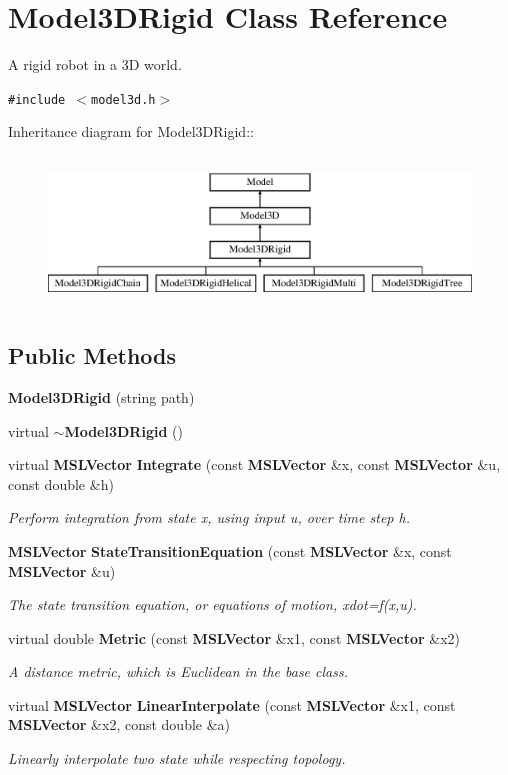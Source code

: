 \section{Model3DRigid  Class Reference}
\label{class_Model3DRigid}
A rigid robot in a 3D world. 


{\tt \#include $<$model3d.h$>$}

Inheritance diagram for Model3DRigid::\begin{figure}[H]
\begin{center}
\leavevmode
\includegraphics[height=4cm]{class_Model3DRigid}
\end{center}
\end{figure}
\subsection*{Public Methods}
\begin{CompactItemize}
\item 
{\bf Model3DRigid} (string path)
\item 
virtual {\bf $\sim$Model3DRigid} ()
\item 
virtual {\bf MSLVector} {\bf Integrate} (const {\bf MSLVector} \&x, const {\bf MSLVector} \&u, const double \&h)
\begin{CompactList}\small\item\em Perform integration from state x, using input u, over time step h.\item\end{CompactList}\item 
{\bf MSLVector} {\bf State\-Transition\-Equation} (const {\bf MSLVector} \&x, const {\bf MSLVector} \&u)
\begin{CompactList}\small\item\em The state transition equation, or equations of motion, xdot=f(x,u).\item\end{CompactList}\item 
virtual double {\bf Metric} (const {\bf MSLVector} \&x1, const {\bf MSLVector} \&x2)
\begin{CompactList}\small\item\em A distance metric, which is Euclidean in the base class.\item\end{CompactList}\item 
virtual {\bf MSLVector} {\bf Linear\-Interpolate} (const {\bf MSLVector} \&x1, const {\bf MSLVector} \&x2, const double \&a)
\begin{CompactList}\small\item\em Linearly interpolate two state while respecting topology.\item\end{CompactList}\end{CompactItemize}


